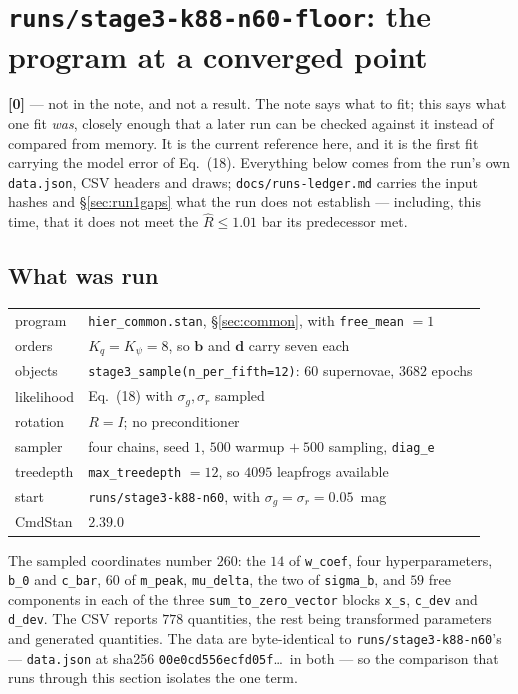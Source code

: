 \documentclass[11pt]{article}
\newcommand{\file}[1]{\texttt{#1}}
\newcommand{\code}[1]{\texttt{#1}}
\begin{document}
\section{\file{runs/stage3-k88-n60-floor}: the program at a converged point}
\label{sec:run1}

\textbf{[0]} --- not in the note, and not a result. The note says what to fit; this says
what one fit \emph{was}, closely enough that a later run can be checked against it instead
of compared from memory. It is the current reference here, and it is the first fit carrying
the model error of Eq.~(18). Everything below comes from the run's own
\code{data.json}, CSV headers and draws; \file{docs/runs-ledger.md} carries the input
hashes and \S\ref{sec:run1gaps} what the run does not establish --- including, this time,
that it does not meet the $\hat R \le 1.01$ bar its predecessor met.

\subsection{What was run}

\begin{tabular}{@{}l l@{}}
\toprule
program & \file{hier\_common.stan}, \S\ref{sec:common}, with \code{free\_mean} $= 1$ \\
orders & $K_{q} = K_{\psi} = 8$, so $\mathbf{b}$ and $\mathbf{d}$ carry seven each \\
objects & \code{stage3\_sample(n\_per\_fifth=12)}: $60$ supernovae, $3682$ epochs \\
likelihood & Eq.~(18) with $\sigma_{g}, \sigma_{r}$ sampled \\
rotation & $R = I$; no preconditioner \\
sampler & four chains, seed $1$, $500$ warmup $+\ 500$ sampling, \code{diag\_e} \\
treedepth & \code{max\_treedepth} $= 12$, so $4095$ leapfrogs available \\
start & \file{runs/stage3-k88-n60}, with $\sigma_{g} = \sigma_{r} = 0.05$~mag \\
CmdStan & $2.39.0$ \\
\bottomrule
\end{tabular}

\medskip\noindent
The sampled coordinates number $260$: the $14$ of \code{w\_coef}, four hyperparameters,
\code{b\_0} and \code{c\_bar}, $60$ of \code{m\_peak}, \code{mu\_delta}, the two of
\code{sigma\_b}, and $59$ free components in each of the three
\code{sum\_to\_zero\_vector} blocks \code{x\_s}, \code{c\_dev} and \code{d\_dev}. The CSV
reports $778$ quantities, the rest being transformed parameters and generated quantities.
The data are byte-identical to \file{runs/stage3-k88-n60}'s --- \code{data.json} at sha256
\code{00e0cd556ecfd05f}\ldots\ in both --- so the comparison that runs through this section
isolates the one term.
\end{document}
